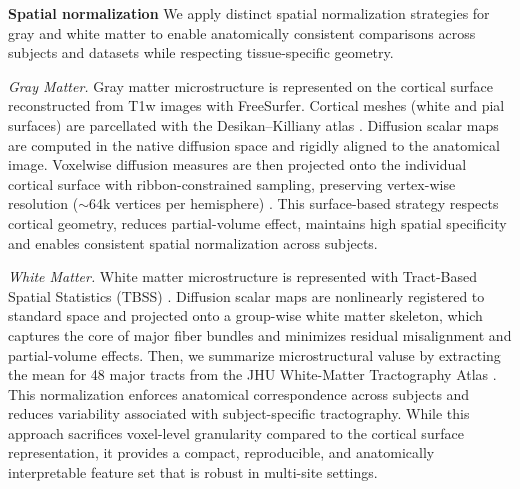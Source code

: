 \noindent \textbf{Spatial normalization}
We apply distinct spatial normalization strategies for gray and white matter to enable anatomically consistent comparisons across subjects and datasets while respecting tissue-specific geometry.

\textit{Gray Matter.}
Gray matter microstructure is represented on the cortical surface reconstructed from T1w images with FreeSurfer. 
Cortical meshes (white and pial surfaces) are parcellated with the Desikan–Killiany atlas \cite{desikan2006automated}.
Diffusion scalar maps are computed in the native diffusion space and rigidly aligned to the anatomical image.
Voxelwise diffusion measures are then projected onto the individual cortical surface with ribbon-constrained sampling, preserving vertex-wise resolution ($\sim64$k vertices per hemisphere) \cite{greve2009accurate}. 
This surface-based strategy respects cortical geometry, reduces partial-volume effect, maintains  high spatial specificity and enables consistent spatial normalization across subjects.


\textit{White Matter.}
White matter microstructure is represented with Tract-Based Spatial Statistics (TBSS) \cite{smith2006tract}.
Diffusion scalar maps are nonlinearly registered to standard space and projected onto a group-wise white matter skeleton, which captures the core of major fiber bundles and minimizes 
residual misalignment and partial-volume effects.
Then, we summarize microstructural valuse by extracting the mean for 48 major tracts from the JHU White-Matter Tractography Atlas \cite{mori2008stereotaxic}.
This normalization enforces anatomical correspondence across subjects and reduces variability associated with subject-specific tractography.
While this approach sacrifices voxel-level granularity compared to the cortical surface representation, it provides a compact, reproducible, and anatomically interpretable feature set that is robust in multi-site settings.





